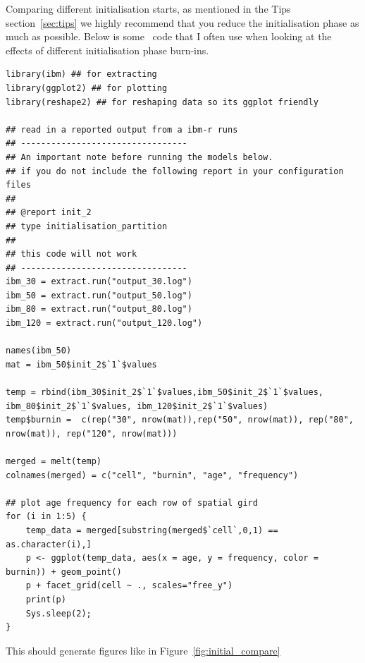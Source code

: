 Comparing different initialisation starts, as mentioned in the Tips section~\ref{sec:tips} we highly recommend that you reduce the initialisation phase as much as possible. Below is some \R\ code that I often use when looking at the effects of different initialisation phase burn-ins.

\begin{lstlisting}
library(ibm) ## for extracting
library(ggplot2) ## for plotting
library(reshape2) ## for reshaping data so its ggplot friendly

## read in a reported output from a ibm-r runs
## ---------------------------------
## An important note before running the models below.
## if you do not include the following report in your configuration files
##
## @report init_2
## type initialisation_partition
##
## this code will not work
## ---------------------------------
ibm_30 = extract.run("output_30.log")
ibm_50 = extract.run("output_50.log")
ibm_80 = extract.run("output_80.log")
ibm_120 = extract.run("output_120.log")

names(ibm_50)
mat = ibm_50$init_2$`1`$values

temp = rbind(ibm_30$init_2$`1`$values,ibm_50$init_2$`1`$values, ibm_80$init_2$`1`$values, ibm_120$init_2$`1`$values)
temp$burnin =  c(rep("30", nrow(mat)),rep("50", nrow(mat)), rep("80", nrow(mat)), rep("120", nrow(mat)))

merged = melt(temp)
colnames(merged) = c("cell", "burnin", "age", "frequency")

## plot age frequency for each row of spatial gird
for (i in 1:5) {
	temp_data = merged[substring(merged$`cell`,0,1) == as.character(i),]
	p <- ggplot(temp_data, aes(x = age, y = frequency, color = burnin)) + geom_point()
	p + facet_grid(cell ~ ., scales="free_y")
	print(p)
    Sys.sleep(2);
}
\end{lstlisting}

This should generate figures like in Figure~\ref{fig:initial_compare}

